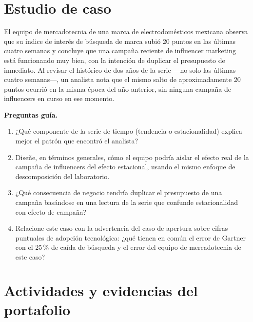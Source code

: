 \section{Estudio de caso}

\begin{casoFicticio}
El equipo de mercadotecnia de una marca de electrodomésticos mexicana
observa que su índice de interés de búsqueda de marca subió 20 puntos en
las últimas cuatro semanas y concluye que una campaña reciente de influencer
marketing está funcionando muy bien, con la intención de duplicar el
presupuesto de inmediato. Al revisar el histórico de dos años de la serie
—no solo las últimas cuatro semanas—, un analista nota que el mismo salto de
aproximadamente 20 puntos ocurrió en la misma época del año anterior, sin
ninguna campaña de influencers en curso en ese momento.

\textbf{Preguntas guía.}
\begin{enumerate}
  \item ¿Qué componente de la serie de tiempo (tendencia o estacionalidad)
  explica mejor el patrón que encontró el analista?
  \item Diseñe, en términos generales, cómo el equipo podría aislar el
  efecto real de la campaña de influencers del efecto estacional, usando el
  mismo enfoque de descomposición del laboratorio.
  \item ¿Qué consecuencia de negocio tendría duplicar el presupuesto de una
  campaña basándose en una lectura de la serie que confunde estacionalidad
  con efecto de campaña?
  \item Relacione este caso con la advertencia del caso de apertura sobre
  cifras puntuales de adopción tecnológica: ¿qué tienen en común el error de
  Gartner con el 25\,\% de caída de búsqueda y el error del equipo de
  mercadotecnia de este caso?
\end{enumerate}
\end{casoFicticio}

\section{Actividades y evidencias del portafolio}

